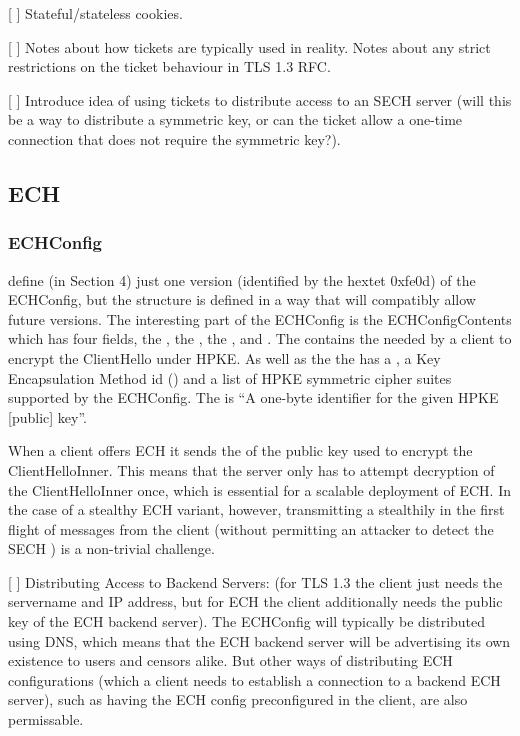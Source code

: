 [ ] Stateful/stateless cookies.

[ ] Notes about how tickets are typically used in reality. Notes about any strict restrictions on the ticket behaviour in TLS 1.3 RFC.

[ ] Introduce idea of using tickets to distribute access to an SECH server (will this be a way to distribute a symmetric key, or can the ticket allow a one-time connection that does not require the symmetric key?).

\subsection{ECH}

\subsubsection{ECHConfig}

\cite{esni} define (in Section 4) just one version (identified by the hextet 0xfe0d) of the ECHConfig, but  the structure is defined in a way that will compatibly allow future versions. The interesting part of the ECHConfig is the ECHConfigContents which has four fields, the , the , the , and . The  contains the  needed by a client to encrypt the ClientHello under HPKE. As well as the  the  has a , a Key Encapsulation Method id () and a list of HPKE symmetric cipher suites supported by the ECHConfig. The  is ``A one-byte identifier for the given HPKE [public] key''.

When a client offers ECH it sends the  of the public key used to encrypt the ClientHelloInner. This  means that the server only has to attempt decryption of the ClientHelloInner once, which is essential for a scalable deployment of ECH. In the case of a stealthy ECH variant, however, transmitting a  stealthily in the first flight of messages from the client (without permitting an attacker to detect the SECH ) is a non-trivial challenge.

[ ] Distributing Access to Backend Servers: (for TLS 1.3 the client just needs the servername and IP address, but for ECH the client additionally needs the public key of the ECH backend server). The ECHConfig will typically be distributed using DNS, which means that the ECH backend server will be advertising its own existence to users and censors alike. But other ways of distributing ECH configurations (which a client needs to establish a connection to a backend ECH server), such as having the ECH config preconfigured in the client, are also permissable.


